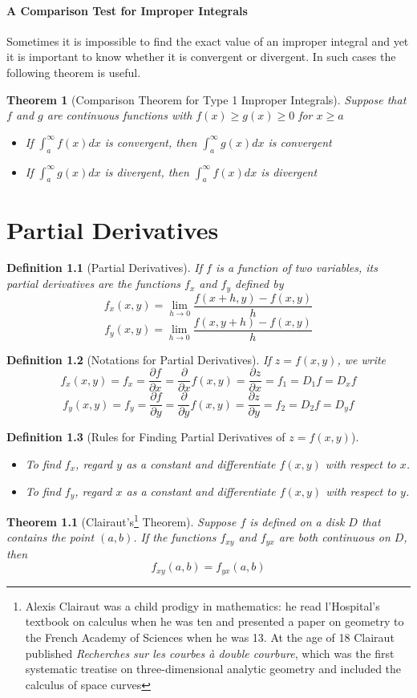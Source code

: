 \documentclass[10pt]{report}
\newtheorem{thm2}{Theorem}[section]
\newtheorem{thm3}{Theorem}[subsection]
\newtheorem{def2}{Definition}[section]
\begin{document}
\subsubsection{A Comparison Test for Improper Integrals}
Sometimes it is impossible to find the exact value of an improper integral and yet it is important to know whether it is convergent or divergent. In such cases the following theorem is useful.
\begin{thm3}[Comparison Theorem for Type 1 Improper Integrals]
Suppose that $f$ and $g$ are continuous functions with $f(x)\geq g(x)\geq 0$ for $x\geq a$
\begin{itemize}
\item[(a)] If $\int_a^\infty f(x)dx$ is convergent, then $\int_a^\infty g(x)dx$ is convergent
\item[(b)] If $\int_a^\infty g(x)dx$ is divergent, then $\int_a^\infty f(x)dx$ is divergent
\end{itemize}
\end{thm3}

\chapter{Partial Derivatives}
\begin{def2}[Partial Derivatives]
If $f$ is a function of two variables, its partial derivatives are the functions $f_x$ and $f_y$ defined by
$$f_x(x,y)=\lim_{h\to 0} \frac{f(x+h,y) - f(x,y)}{h}$$
$$f_y(x,y)=\lim_{h\to 0} \frac{f(x,y+h) - f(x,y)}{h}$$
\end{def2}
\begin{def2}[Notations for Partial Derivatives]
If $z=f(x,y)$, we write
$$f_x(x,y) = f_x = \frac{\partial f}{\partial x} = \frac{\partial}{\partial x}f(x,y) = \frac{\partial z}{\partial x} = f_1 = D_1f = D_xf$$
$$f_y(x,y) = f_y = \frac{\partial f}{\partial y} = \frac{\partial}{\partial y}f(x,y) = \frac{\partial z}{\partial y} = f_2 = D_2f = D_yf$$
\end{def2}
\begin{def2}[Rules for Finding Partial Derivatives of $z=f(x,y)$]
\begin{itemize}
\item[1.] To find $f_x$, regard $y$ as a constant and differentiate $f(x,y)$ with respect to $x$.
\item[2.] To find $f_y$, regard $x$ as a constant and differentiate $f(x,y)$ with respect to $y$.
\end{itemize}
\end{def2}
\begin{thm2}[Clairaut's\footnote{Alexis Clairaut was a child prodigy in mathematics: he read l'Hospital's textbook on calculus when he was ten and presented a paper on geometry to the French Academy of Sciences when he was 13. At the age of 18 Clairaut published \textit{Recherches sur les courbes \`{a} double courbure}, which was the first systematic treatise on three-dimensional analytic geometry and included the calculus of space curves} Theorem]
 Suppose $f$ is defined on a disk $D$ that contains the point $(a,b)$. If the functions $f_{xy}$ and $f_{yx}$ are both continuous on $D$, then
 $$f_{xy}(a,b) = f_{yx}(a,b)$$
\end{thm2}
\end{document}

